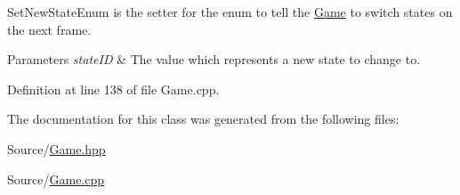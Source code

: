 Set\-New\-State\-Enum is the setter for the enum to tell the \hyperlink{class_game}{Game} to switch states on the next frame. 


\begin{DoxyParams}{Parameters}
{\em state\-I\-D} & The value which represents a new state to change to. \\
\hline
\end{DoxyParams}


Definition at line 138 of file Game.\-cpp.



The documentation for this class was generated from the following files\-:\begin{DoxyCompactItemize}
\item 
Source/\hyperlink{_game_8hpp}{Game.\-hpp}\item 
Source/\hyperlink{_game_8cpp}{Game.\-cpp}\end{DoxyCompactItemize}
